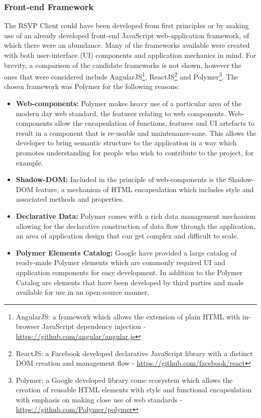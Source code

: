     \subsubsection{Front-end Framework}
      The RSVP Client could have been developed from first principles or by making use of an already developed front-end JavaScript web-application framework, of which there were an abundance. Many of the frameworks available were created with both user-interface (UI) components and application mechanics in mind. For brevity, a comparison of the candidate frameworks is not shown, however the ones that were considered include AngularJS\footnote{AngularJS: a framework which allows the extension of plain HTML with in-browser JavaScript dependency injection - \url{https://github.com/angular/angular.js}}, ReactJS\footnote{ReactJS: a Facebook developed declarative JavaScript library with a distinct DOM creation and management flow - \url{https://github.com/facebook/react}} and Polymer\footnote{Polymer: a Google developed library come ecosystem which allows the creation of reusable HTML elements with style and functional encapsulation with emphasis on making close use of web standards - \url{https://github.com/Polymer/polymer}}. The chosen framework was Polymer for the following reasons:
      \begin{itemize}
        \item \textbf{Web-components:} Polymer makes heavy use of a particular area of the modern day web standard, the features relating to web components. Web-components allow the encapsulation of functions, features and UI artefacts to result in a component that is re-usable and maintenance-sane. This allows the developer to bring semantic structure to the application in a way which promotes understanding for people who wish to contribute to the project, for example.
        \item \textbf{Shadow-DOM:} Included in the principle of web-components is the Shadow-DOM feature, a mechanism of HTML encapsulation which includes style and associated methods and properties.
        \item \textbf{Declarative Data:} Polymer comes with a rich data management mechanism allowing for the declarative construction of data flow through the application, an area of application design that can get complex and difficult to scale.
        \item \textbf{Polymer Elements Catalog:} Google have provided a large catalog of ready-made Polymer elements which are commonly required UI and application components for easy development. In addition to the Polymer Catalog are elements that have been developed by third parties and made available for use in an open-source manner.
      \end{itemize}
      
